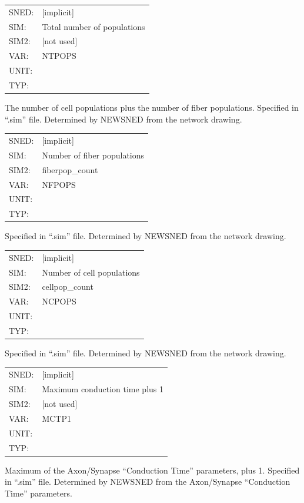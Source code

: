 \documentclass[12pt,openany,oneside]{book}
\begin{document}
\begin{flushleft}
\begin{tabular}{@{}ll@{}}
SNED: & [implicit]\\
SIM: & Total number of populations\\
SIM2: & [not used]\\
VAR: & NTPOPS\\
UNIT: &\\
TYP: &\\
\end{tabular}
\end{flushleft}
\noindent
The number of cell populations plus the number of fiber populations.
Specified in ``.sim'' file.  Determined by NEWSNED from the network
drawing.
\filbreak
\vspace{\baselineskip}

\begin{flushleft}
\begin{tabular}{@{}ll@{}}
SNED: & [implicit]\\
SIM: & Number of fiber populations\\
SIM2: & fiberpop\_count\\
VAR: & NFPOPS\\
UNIT: &\\
TYP: &\\
\end{tabular}
\end{flushleft}
\noindent
Specified in ``.sim'' file.  Determined by NEWSNED from the network
drawing.
\filbreak
\vspace{\baselineskip}

\begin{flushleft}
\begin{tabular}{@{}ll@{}}
SNED: & [implicit]\\
SIM: & Number of cell populations\\
SIM2: & cellpop\_count\\
VAR: & NCPOPS\\
UNIT: &\\
TYP: &\\
\end{tabular}
\end{flushleft}
\noindent
Specified in ``.sim'' file.  Determined by NEWSNED from the network
drawing.
\filbreak
\vspace{\baselineskip}

\begin{flushleft}
\begin{tabular}{@{}ll@{}}
SNED: & [implicit]\\
SIM: & Maximum conduction time plus 1\\
SIM2: & [not used]\\
VAR: & MCTP1\\
UNIT: &\\
TYP: &\\
\end{tabular}
\end{flushleft}
\noindent
Maximum of the Axon/Synapse ``Conduction Time'' parameters, plus 1.
Specified in ``.sim'' file.  Determined by NEWSNED from the
Axon/Synapse ``Conduction Time'' parameters.
\filbreak
\vspace{\baselineskip}
\end{document}
